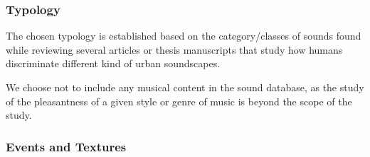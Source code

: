 \documentclass[12pt]{elsarticle}
\newcommand{\etc}{\emph{etc.}}
\begin{document}
\subsubsection*{Typology}


The chosen typology is established based on the category/classes of sounds found while reviewing several articles or thesis manuscripts \cite{maffiolo_caracterisation_1999,raimbault2002simulation,guastavino_etude_2003,defreville2004aactivity,raimbault2005urban,dubois2006cognitive,devergie_relations_2006,guastavino2006ideal,niessen2010categories,maffiolo_caracterisation_1999,beaumont2004pertinence,polack2008perceptive,leobon_analyse_1986,brown2011towards} that study how humans discriminate different kind of urban soundscapes.


We choose not to include any musical content in the sound database, as the study of the pleasantness of a given style or genre of music is beyond the scope of the study.

\subsubsection*{Events and Textures}

\end{document}
